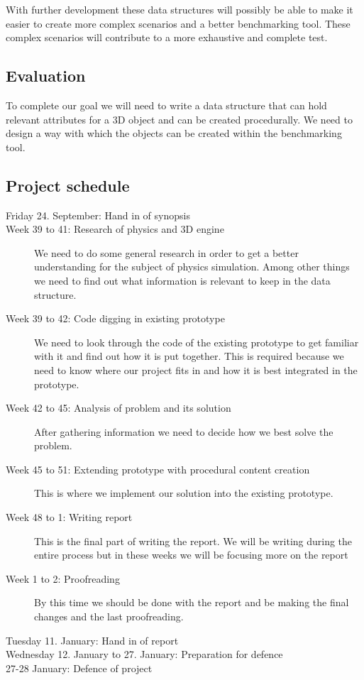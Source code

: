 \documentclass[a4paper, 10pt]{article}
\begin{document}
With further development these data structures will possibly be able to make it easier to create more complex scenarios
and a better benchmarking tool. These complex scenarios will contribute to a more exhaustive and complete test.
\subsection*{Evaluation}
To complete our goal we will need to write a data structure that can hold relevant attributes for a 3D object and can be
created procedurally. We need to design a way with which the objects can be created within the benchmarking tool.
\subsection*{Project schedule}
\begin{description}
\item[Friday 24. September: Hand in of synopsis]
\item[Week 39 to 41: Research of physics and 3D engine] We need to do some general research in order to get a better
understanding for the subject of physics simulation. Among other things we need to find out what information is relevant to keep in the
data structure.
\item[Week 39 to 42: Code digging in existing prototype]
We need to look through the code of the existing prototype to get familiar with it and find out how it is put together. This
is required because we need to know where our project fits in and how it is best integrated in the prototype.
\item[Week 42 to 45: Analysis of problem and its solution]
After gathering information we need to decide how we best solve the problem.
\item[Week 45 to 51: Extending prototype with procedural content creation] This is where we implement our solution into
the existing prototype.
\item[Week 48 to 1: Writing report]
This is the final part of writing the report. We will be writing during the entire process but in these weeks we will be
focusing more on the report
\item[Week 1 to 2:  Proofreading]
By this time we should be done with the report and be making the final changes and the last proofreading.
\item[Tuesday 11. January: Hand in of report]
\item[Wednesday 12. January to 27. January: Preparation for defence]
\item[27-28 January: Defence of project]
\end{description}
\end{document}
